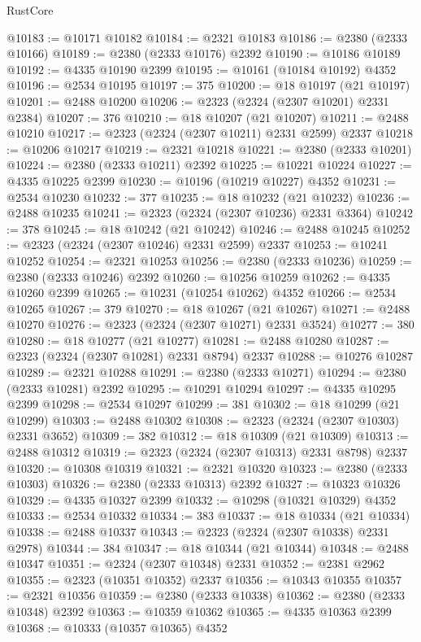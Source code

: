 \begin{lexlean}{RustCore}
\begin{coremodule}
@10183 := @10171 @10182
@10184 := @2321 @10183
@10186 := @2380 (@2333 @10166)
@10189 := @2380 (@2333 @10176) @2392
@10190 := @10186 @10189
@10192 := @4335 @10190 @2399
@10195 := @10161 (@10184 @10192) @4352
@10196 := @2534 @10195
@10197 := 375
@10200 := @18 @10197 (@21 @10197)
@10201 := @2488 @10200
@10206 := @2323 (@2324 (@2307 @10201) @2331 @2384)
@10207 := 376
@10210 := @18 @10207 (@21 @10207)
@10211 := @2488 @10210
@10217 := @2323 (@2324 (@2307 @10211) @2331 @2599) @2337
@10218 := @10206 @10217
@10219 := @2321 @10218
@10221 := @2380 (@2333 @10201)
@10224 := @2380 (@2333 @10211) @2392
@10225 := @10221 @10224
@10227 := @4335 @10225 @2399
@10230 := @10196 (@10219 @10227) @4352
@10231 := @2534 @10230
@10232 := 377
@10235 := @18 @10232 (@21 @10232)
@10236 := @2488 @10235
@10241 := @2323 (@2324 (@2307 @10236) @2331 @3364)
@10242 := 378
@10245 := @18 @10242 (@21 @10242)
@10246 := @2488 @10245
@10252 := @2323 (@2324 (@2307 @10246) @2331 @2599) @2337
@10253 := @10241 @10252
@10254 := @2321 @10253
@10256 := @2380 (@2333 @10236)
@10259 := @2380 (@2333 @10246) @2392
@10260 := @10256 @10259
@10262 := @4335 @10260 @2399
@10265 := @10231 (@10254 @10262) @4352
@10266 := @2534 @10265
@10267 := 379
@10270 := @18 @10267 (@21 @10267)
@10271 := @2488 @10270
@10276 := @2323 (@2324 (@2307 @10271) @2331 @3524)
@10277 := 380
@10280 := @18 @10277 (@21 @10277)
@10281 := @2488 @10280
@10287 := @2323 (@2324 (@2307 @10281) @2331 @8794) @2337
@10288 := @10276 @10287
@10289 := @2321 @10288
@10291 := @2380 (@2333 @10271)
@10294 := @2380 (@2333 @10281) @2392
@10295 := @10291 @10294
@10297 := @4335 @10295 @2399
@10298 := @2534 @10297
@10299 := 381
@10302 := @18 @10299 (@21 @10299)
@10303 := @2488 @10302
@10308 := @2323 (@2324 (@2307 @10303) @2331 @3652)
@10309 := 382
@10312 := @18 @10309 (@21 @10309)
@10313 := @2488 @10312
@10319 := @2323 (@2324 (@2307 @10313) @2331 @8798) @2337
@10320 := @10308 @10319
@10321 := @2321 @10320
@10323 := @2380 (@2333 @10303)
@10326 := @2380 (@2333 @10313) @2392
@10327 := @10323 @10326
@10329 := @4335 @10327 @2399
@10332 := @10298 (@10321 @10329) @4352
@10333 := @2534 @10332
@10334 := 383
@10337 := @18 @10334 (@21 @10334)
@10338 := @2488 @10337
@10343 := @2323 (@2324 (@2307 @10338) @2331 @2978)
@10344 := 384
@10347 := @18 @10344 (@21 @10344)
@10348 := @2488 @10347
@10351 := @2324 (@2307 @10348) @2331
@10352 := @2381 @2962
@10355 := @2323 (@10351 @10352) @2337
@10356 := @10343 @10355
@10357 := @2321 @10356
@10359 := @2380 (@2333 @10338)
@10362 := @2380 (@2333 @10348) @2392
@10363 := @10359 @10362
@10365 := @4335 @10363 @2399
@10368 := @10333 (@10357 @10365) @4352

\end{coremodule}
\end{lexlean}
